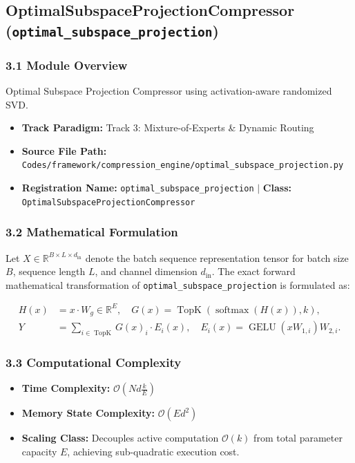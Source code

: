 \subsection{OptimalSubspaceProjectionCompressor (\texttt{optimal\_subspace\_projection})}
\label{sec:app_module_optimal\_subspace\_projection}

\subsubsection*{3.1 Module Overview}
Optimal Subspace Projection Compressor using activation-aware randomized SVD.
\begin{itemize}
    \item \textbf{Track Paradigm:} Track 3: Mixture-of-Experts & Dynamic Routing
    \item \textbf{Source File Path:} \texttt{Codes/framework/compression\_engine/optimal\_subspace\_projection.py}
    \item \textbf{Registration Name:} \texttt{optimal\_subspace\_projection} $\mid$ \textbf{Class:} \texttt{OptimalSubspaceProjectionCompressor}
\end{itemize}

\subsubsection*{3.2 Mathematical Formulation}
Let $X \in \mathbb{R}^{B \times L \times d_{\text{in}}}$ denote the batch sequence representation tensor for batch size $B$, sequence length $L$, and channel dimension $d_{\text{in}}$. The exact forward mathematical transformation of \texttt{optimal\_subspace\_projection} is formulated as:

\begin{align}
H(x) &= x \cdot W_g \in \mathbb{R}^{E}, \quad G(x) = \operatorname{TopK}\left(\operatorname{softmax}(H(x)), k\right), \\
Y &= \sum_{i \in \operatorname{TopK}} G(x)_i \cdot E_i(x), \quad E_i(x) = \operatorname{GELU}(x W_{1, i}) W_{2, i}.
\end{align}


\subsubsection*{3.3 Computational Complexity}
\begin{itemize}
    \item \textbf{Time Complexity:} $\mathcal{O}(N d \frac{k}{E})$
    \item \textbf{Memory State Complexity:} $\mathcal{O}(E d^2)$
    \item \textbf{Scaling Class:} Decouples active computation $\mathcal{O}(k)$ from total parameter capacity $E$, achieving sub-quadratic execution cost.
\end{itemize}

